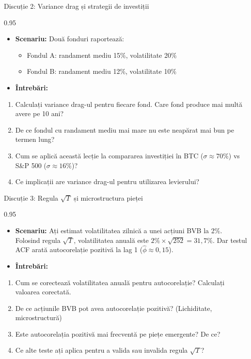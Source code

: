 \documentclass[9pt, aspectratio=169, t]{beamer}
\begin{document}
\begin{frame}[shrink=10]{Discuție 2: Variance drag și strategii de investiții}
\begin{cminipage}{0.95\textwidth}
    \begin{itemize}\setlength{\itemsep}{0pt}
        \item \textbf{Scenariu:} Două fonduri raportează:
        \begin{itemize}\setlength{\itemsep}{0pt}
            \item Fondul A: randament mediu 15\%, volatilitate 20\%
            \item Fondul B: randament mediu 12\%, volatilitate 10\%
        \end{itemize}
        \item \textbf{Întrebări:}
    \end{itemize}
    \begin{enumerate}\setlength{\itemsep}{0pt}
        \item Calculați variance drag-ul pentru fiecare fond. Care fond produce mai multă avere pe 10 ani?
        \item De ce fondul cu randament mediu mai mare nu este neapărat mai bun pe termen lung?
        \item Cum se aplică această lecție la compararea investiției în BTC ($\sigma \approx 70\%$) vs S\&P 500 ($\sigma \approx 16\%$)?
        \item Ce implicații are variance drag-ul pentru utilizarea levierului?
    \end{enumerate}
\end{cminipage}
\end{frame}

\begin{frame}[shrink=10]{Discuție 3: Regula $\sqrt{T}$ și microstructura pieței}
\begin{cminipage}{0.95\textwidth}
    \begin{itemize}\setlength{\itemsep}{0pt}
        \item \textbf{Scenariu:} Ați estimat volatilitatea zilnică a unei acțiuni BVB la 2\%. Folosind regula $\sqrt{T}$, volatilitatea anuală este $2\% \times \sqrt{252} = 31{,}7\%$. Dar testul ACF arată autocorelație pozitivă la lag 1 ($\hat{\phi} \approx 0{,}15$).
        \item \textbf{Întrebări:}
    \end{itemize}
    \begin{enumerate}\setlength{\itemsep}{0pt}
        \item Cum se corectează volatilitatea anuală pentru autocorelație? Calculați valoarea corectată.
        \item De ce acțiunile BVB pot avea autocorelație pozitivă? (Lichiditate, microstructură)
        \item Este autocorelația pozitivă mai frecventă pe piețe emergente? De ce?
        \item Ce alte teste ați aplica pentru a valida sau invalida regula $\sqrt{T}$?
    \end{enumerate}
\end{cminipage}
\end{frame}
\end{document}
